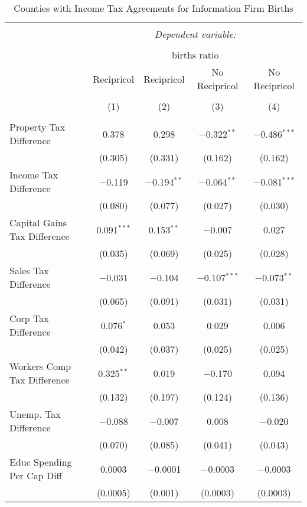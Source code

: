 
\begin{table}[!htbp] \centering 
  \caption{Counties with Income Tax Agreements for  Information Firm Births} 
  \label{51rd} 
\begin{tabular}{@{\extracolsep{5pt}}lcccc} 
\\[-1.8ex]\hline 
\hline \\[-1.8ex] 
 & \multicolumn{4}{c}{\textit{Dependent variable:}} \\ 
\cline{2-5} 
\\[-1.8ex] & \multicolumn{4}{c}{births ratio} \\ 
 & Recipricol & Recipricol & No Recipricol & No Recipricol \\ 
\\[-1.8ex] & (1) & (2) & (3) & (4)\\ 
\hline \\[-1.8ex] 
 Property Tax Difference & 0.378 & 0.298 & $-$0.322$^{**}$ & $-$0.486$^{***}$ \\ 
  & (0.305) & (0.331) & (0.162) & (0.162) \\ 
  Income Tax Difference & $-$0.119 & $-$0.194$^{**}$ & $-$0.064$^{**}$ & $-$0.081$^{***}$ \\ 
  & (0.080) & (0.077) & (0.027) & (0.030) \\ 
  Capital Gains Tax Difference & 0.091$^{***}$ & 0.153$^{**}$ & $-$0.007 & 0.027 \\ 
  & (0.035) & (0.069) & (0.025) & (0.028) \\ 
  Sales Tax Difference & $-$0.031 & $-$0.104 & $-$0.107$^{***}$ & $-$0.073$^{**}$ \\ 
  & (0.065) & (0.091) & (0.031) & (0.031) \\ 
  Corp Tax Difference & 0.076$^{*}$ & 0.053 & 0.029 & 0.006 \\ 
  & (0.042) & (0.037) & (0.025) & (0.025) \\ 
  Workers Comp Tax Difference & 0.325$^{**}$ & 0.019 & $-$0.170 & 0.094 \\ 
  & (0.132) & (0.197) & (0.124) & (0.136) \\ 
  Unemp. Tax Difference & $-$0.088 & $-$0.007 & 0.008 & $-$0.020 \\ 
  & (0.070) & (0.085) & (0.041) & (0.043) \\ 
  Educ Spending Per Cap Diff & 0.0003 & $-$0.0001 & $-$0.0003 & $-$0.0003 \\ 
  & (0.0005) & (0.001) & (0.0003) & (0.0003) \\ 

\end{tabular}
\end{table}
